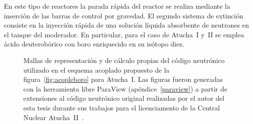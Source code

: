 En este tipo de reactores la parada rápida del reactor se realiza mediante la inserción de las barras de control por gravedad. El segundo sistema de extinción consiste en la inyección rápida de una solución líquida absorbente de neutrones en el tanque del moderador. En particular, para el caso de Atucha~I y~II se emplea ácido deuterobórico con boro enriquecido en su isótopo diez. 

 


\begin{figure}[p]
\begin{center}

\end{center}
\caption{\label{fig:mallaspce} Mallas de representación y de cálculo propias del código neutrónico utilizado en el esquema acoplado propuesto de la figura~\ref{fig:acopleboro} para Atucha~I. Las figuras fueron generadas con la herramienta libre ParaView (apéndice~\ref{paraview}) a partir de extensiones al código neutrónico original realizadas por el autor del esta tesis durante sus trabajos para el licenciamento de la Central Nuclear Atucha~II~\cite{aatn-pumita-2014}.}
\end{figure}


